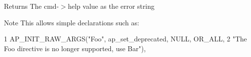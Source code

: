 \begin{DoxyReturn}{Returns}
The cmd-\/$>$help value as the error string 
\end{DoxyReturn}
\begin{DoxyNote}{Note}
This allows simple declarations such as\+: 
\begin{DoxyCode}
1 AP\_INIT\_RAW\_ARGS("Foo", ap\_set\_deprecated, NULL, OR\_ALL,
2     "The Foo directive is no longer supported, use Bar"),
\end{DoxyCode}
 
\end{DoxyNote}
